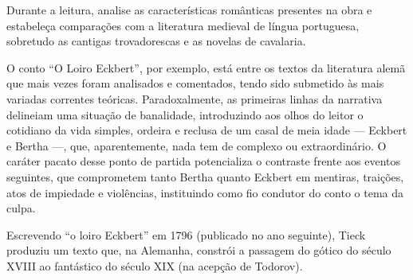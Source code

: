 \documentclass[11pt]{extarticle}
\begin{document}

Durante a leitura, analise as características românticas
presentes na obra e estabeleça comparações com a literatura medieval de
língua portuguesa, sobretudo as cantigas trovadorescas e as novelas de
cavalaria.

O conto ``O Loiro Eckbert'', por exemplo, está entre os textos da
literatura alemã que mais vezes foram analisados e comentados, tendo
sido submetido às mais variadas correntes teóricas. Paradoxalmente, as
primeiras linhas da narrativa delineiam uma situação de banalidade,
introduzindo aos olhos do leitor o cotidiano da vida simples, ordeira e
reclusa de um casal de meia idade --- Eckbert e Bertha ---, que,
aparentemente, nada tem de complexo ou extraordinário. O caráter pacato
desse ponto de partida potencializa o contraste frente aos eventos
seguintes, que comprometem tanto Bertha quanto Eckbert em mentiras,
traições, atos de impiedade e violências, instituindo como fio condutor
do conto o tema da culpa.

Escrevendo ``o loiro Eckbert'' em 1796 (publicado no ano seguinte),
Tieck produziu um texto que, na Alemanha, constrói a passagem do gótico
do século XVIII ao fantástico do século XIX (na acepção de Todorov).
\end{document}
